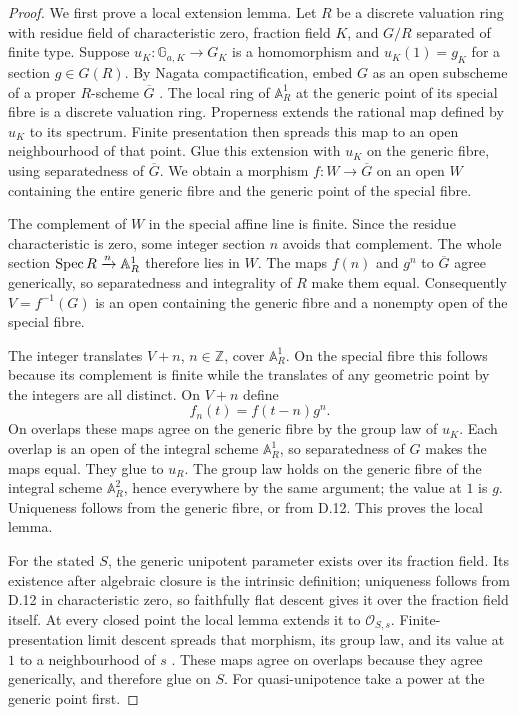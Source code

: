 \begin{proof}
We first prove a local extension lemma. Let $R$ be a discrete valuation
ring with residue field of characteristic zero, fraction field $K$,
and $G/R$ separated of finite type. Suppose
$u_K:\mathbb G_{a,K}\to G_K$ is a homomorphism and $u_K(1)=g_K$
for a section $g\in G(R)$. By Nagata compactification, embed $G$ as
an open subscheme of a proper $R$-scheme $\overline G$
\citep[Theorem 38.33.8, Tag 0F41]{DN_StacksNagata}.
The local ring of $\mathbb A^1_R$ at the generic point of its special
fibre is a discrete valuation ring. Properness extends the rational
map defined by $u_K$ to its spectrum. Finite presentation then spreads
this map to an open neighbourhood of that point. Glue this extension
with $u_K$ on the generic fibre, using separatedness of $\overline G$.
We obtain a morphism $f:W\to\overline G$ on an open $W$ containing
the entire generic fibre and the generic point of the special fibre.

The complement of $W$ in the special affine line is finite. Since
the residue characteristic is zero, some integer section $n$ avoids
that complement. The whole section $\operatorname{Spec} R\xrightarrow{n}\mathbb A^1_R$
therefore lies in $W$. The maps $f(n)$ and $g^n$ to $\overline G$
agree generically, so separatedness and integrality of $R$ make them
equal. Consequently $V=f^{-1}(G)$ is an open containing the generic
fibre and a nonempty open of the special fibre.

The integer translates $V+n$, $n\in\mathbb Z$, cover
$\mathbb A^1_R$. On the special fibre this follows because its
complement is finite while the translates of any geometric point
by the integers are all distinct. On $V+n$ define
\[
                         f_n(t)=f(t-n)g^n.
\]
On overlaps these maps agree on the generic fibre by the group law
of $u_K$. Each overlap is an open of the integral scheme
$\mathbb A^1_R$, so separatedness of $G$ makes the maps equal.
They glue to $u_R$. The group law holds on the generic fibre of
the integral scheme $\mathbb A^2_R$, hence everywhere by the same
argument; the value at $1$ is $g$. Uniqueness follows from the
generic fibre, or from D.12. This proves the local lemma.

For the stated $S$, the generic unipotent parameter exists over its
fraction field. Its existence after algebraic closure is the intrinsic
definition; uniqueness follows from D.12 in characteristic zero, so
faithfully flat descent gives it over the fraction field itself.
At every closed point the local lemma extends it to $\mathcal O_{S,s}$.
Finite-presentation limit descent spreads that morphism, its group law,
and its value at $1$ to a neighbourhood of $s$
\citep[Lemma 32.10.1(2)--(3), Tag 01ZM]{DN_StacksLimits}. These maps agree on
overlaps because they agree generically, and therefore glue on $S$.
For quasi-unipotence take a power at the generic point first.


\end{proof}

